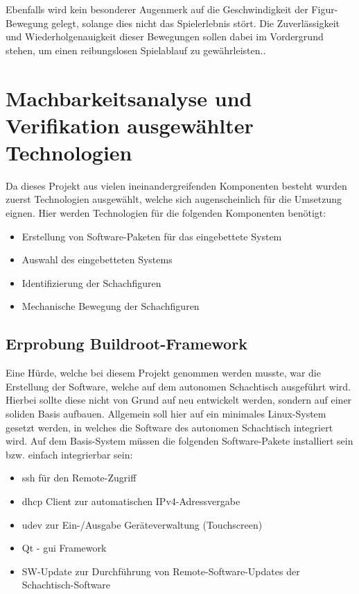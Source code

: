 Ebenfalls wird kein besonderer Augenmerk auf die Geschwindigkeit der
Figur-Bewegung gelegt, solange dies nicht das Spielerlebnis stört. Die
Zuverlässigkeit und Wiederholgenauigkeit dieser Bewegungen sollen dabei
im Vordergrund stehen, um einen reibungslosen Spielablauf zu
gewährleisten..

\hypertarget{machbarkeitsanalyse-und-verifikation-ausgewuxe4hlter-technologien}{%
\chapter{Machbarkeitsanalyse und Verifikation ausgewählter
Technologien}\label{machbarkeitsanalyse-und-verifikation-ausgewuxe4hlter-technologien}}

Da dieses Projekt aus vielen ineinandergreifenden Komponenten besteht
wurden zuerst Technologien ausgewählt, welche sich augenscheinlich für
die Umsetzung eignen. Hier werden Technologien für die folgenden
Komponenten benötigt:

\begin{itemize}
\tightlist
\item
  Erstellung von Software-Paketen für das eingebettete System
\item
  Auswahl des eingebetteten Systems
\item
  Identifizierung der Schachfiguren
\item
  Mechanische Bewegung der Schachfiguren
\end{itemize}

\hypertarget{erprobung-buildroot-framework}{%
\section{Erprobung
Buildroot-Framework}\label{erprobung-buildroot-framework}}

Eine Hürde, welche bei diesem Projekt genommen werden musste, war die
Erstellung der Software, welche auf dem autonomen Schachtisch ausgeführt
wird. Hierbei sollte diese nicht von Grund auf neu entwickelt werden,
sondern auf einer soliden Basis aufbauen. Allgemein soll hier auf ein
minimales Linux-System gesetzt werden, in welches die Software des
autonomen Schachtisch integriert wird. Auf dem Basis-System müssen die
folgenden Software-Pakete installiert sein bzw. einfach integrierbar
sein:

\begin{itemize}
\tightlist
\item
  \gls{ssh} für den Remote-Zugriff
\item
  \gls{dhcp} Client zur automatischen IPv4-Adressvergabe
\item
  \gls{udev} zur Ein-/Ausgabe Geräteverwaltung (Touchscreen)
\item
  Qt\cite{qtframework} - \gls{gui} Framework
\item
  SW-Update zur Durchführung von Remote-Software-Updates der
  Schachtisch-Software
\end{itemize}

